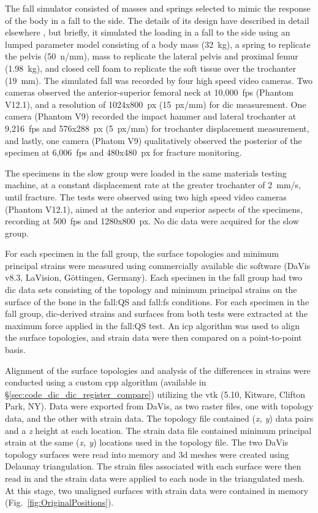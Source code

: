 The fall simulator consisted of masses and springs selected to mimic the response of the body in a fall to the side.
The details of its design have described in detail elsewhere \cite{gilchrist_development_2013}, but briefly, it simulated the loading in a fall to the side using an lumped parameter model consisting of a body mass (32~\ac{kg}), a spring to replicate the pelvis (50~\ac{n}/\ac{mm}), mass to replicate the lateral pelvis and proximal femur (1.98~\ac{kg}), and closed cell foam to replicate the soft tissue over the trochanter (19~\ac{mm}).
The simulated fall was recorded by four high speed video cameras.
Two cameras observed the anterior-superior femoral neck at 10,000~\ac{fps} (Phantom V12.1), and a resolution of 1024x800~\ac{px} (15~\ac{px}/\ac{mm}) for \ac{dic} measurement.
One camera (Phantom V9) recorded the impact hammer and lateral trochanter at 9,216~\ac{fps} and 576x288~\ac{px} (5~\ac{px}/\ac{mm}) for trochanter displacement measurement, and lastly, one camera (Phatom V9) qualitatively observed the posterior of the specimen at 6,006~\ac{fps} and 480x480~\ac{px} for fracture monitoring.

The specimens in the slow group were loaded in the same materials testing machine, at a constant displacement rate at the greater trochanter of 2~\ac{mm}/\ac{s}, until fracture.
The tests were observed using two high speed video cameras (Phantom V12.1), aimed at the anterior and superior aspects of the specimens, recording at 500~\ac{fps} and 1280x800~\ac{px}.
No \ac{dic} data were acquired for the slow group.

For each specimen in the fall group, the surface topologies and minimum principal strains were measured using commercially available \ac{dic} software (DaVis v8.3, LaVision, G\"{o}ttingen, Germany).
Each specimen in the fall group had two \ac{dic} data sets consisting of the topology and minimum principal strains on the surface of the bone in the fall:\ac{QS} and fall:\ac{fs} conditions.
For each specimen in the fall group, \ac{dic}-derived strains and surfaces from both tests were extracted at the maximum force applied in the fall:\ac{QS} test.
An \ac{icp} algorithm was used to align the surface topologies, and strain data were then compared on a point-to-point basis.

Alignment of the surface topologies and analysis of the differences in strains were conducted using a custom \ac{cpp} algorithm (available in \S\ref{sec:code_dic_dic_register_compare}) utilizing the \ac{vtk} (5.10, Kitware, Clifton Park, NY).
Data were exported from DaVis, as two raster files, one with topology data, and the other with strain data.
The topology file contained (\textit{x, y}) data pairs and a \textit{z} height at each location.
The strain data file contained minimum principal strain at the same (\textit{x, y}) locations used in the topology file.
The two DaVis topology surfaces were read into memory and \ac{3d} meshes were created using Delaunay triangulation.
The strain files associated with each surface were then read in and the strain data were applied to each node in the triangulated mesh.
At this stage, two unaligned surfaces with strain data were contained in memory (Fig.~\ref{fig:OriginalPositions}).

